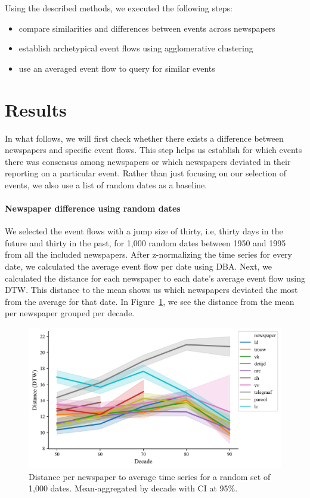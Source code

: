 \documentclass[]{ceurart}
\begin{document}
\noindent Using the described methods, we executed the following steps:

\begin{itemize}
    \item compare similarities and differences between events across newspapers
    \item establish archetypical event flows using agglomerative clustering
    \item use an averaged event flow to query for similar events
\end{itemize}

\section{Results}
%
In what follows, we will first check whether there exists a difference between newspapers and specific event flows. This step helps us establish for which events there was consensus among newspapers or which newspapers deviated in their reporting on a particular event. Rather than just focusing on our selection of events, we also use a list of random dates as a baseline. 

\paragraph{Newspaper difference using random dates}
We selected the event flows with a jump size of thirty, i.e, thirty days in the future and thirty in the past, for 1,000 random dates between 1950 and 1995 from all the included newspapers. After z-normalizing the time series for every date, we calculated the average event flow per date using DBA. Next, we calculated the distance for each newspaper to each date's average event flow using DTW. This distance to the mean shows us which newspapers deviated the most from the average for that date. In Figure~\ref{fig:newspaper_difference}, we see the distance from the mean per newspaper grouped per decade.

\begin{figure}
    \centering
    \includegraphics[width=\linewidth]{figures/img6.png}
    \caption{Distance per newspaper to average time series for a random set of 1,000 dates. Mean-aggregated by decade with CI at 95\%.}
    \label{fig:newspaper_difference}
\end{figure}
\end{document}
